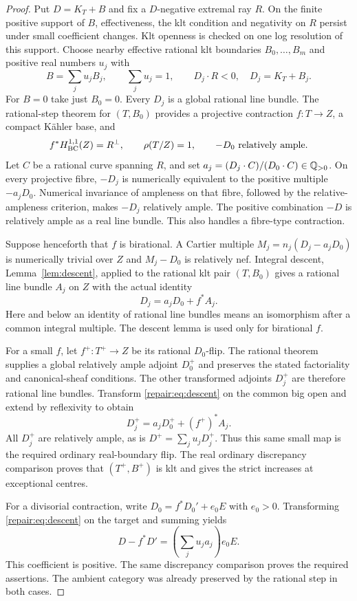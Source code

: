 \begin{proof}
Put $D=K_T+B$ and fix a $D$-negative extremal ray $R$. On the finite
positive support of $B$, effectiveness, the klt condition and negativity
on $R$ persist under small coefficient changes. Klt openness is checked
on one log resolution of this support. Choose nearby effective rational
klt boundaries $B_0,\ldots,B_m$ and positive real numbers $u_j$ with
\[
 B=\sum_j u_jB_j,\qquad \sum_j u_j=1,
 \qquad D_j\cdot R<0,\quad D_j=K_T+B_j.
\]
For $B=0$ take just $B_0=0$. Every $D_j$ is a global rational line
bundle. The rational-step theorem for $(T,B_0)$ provides a projective
contraction $f:T\to Z$, a compact K\"ahler base, and
\[
 f^*H^{1,1}_{\mathrm{BC}}(Z)=R^\perp,\qquad \rho(T/Z)=1,
 \qquad -D_0\text{ relatively ample}.
\]
Let $C$ be a rational curve spanning $R$, and set
$a_j=(D_j\cdot C)/(D_0\cdot C)\in\mathbb Q_{>0}$. On every projective
fibre, $-D_j$ is numerically equivalent to the positive multiple
$-a_jD_0$. Numerical invariance of ampleness on that fibre, followed
by the relative-ampleness criterion, makes $-D_j$ relatively ample.
The positive combination $-D$ is relatively ample as a real line
bundle. This also handles a fibre-type contraction.

Suppose henceforth that $f$ is birational. A Cartier multiple
$M_j=n_j(D_j-a_jD_0)$ is numerically trivial over $Z$ and
$M_j-D_0$ is relatively nef. Integral descent, Lemma~\ref{lem:descent},
applied to the rational klt pair $(T,B_0)$ gives a rational line bundle
$A_j$ on $Z$ with the actual identity
\begin{equation}\label{repair:eq:descent}
 D_j=a_jD_0+f^*A_j.
\end{equation}
Here and below an identity of rational line bundles means an isomorphism
after a common integral multiple. The descent lemma is used only for
birational $f$.

For a small $f$, let $f^+:T^+\to Z$ be its rational $D_0$-flip.
The rational theorem supplies a global relatively ample adjoint
$D_0^+$ and preserves the stated factoriality and canonical-sheaf
conditions. The other transformed adjoints $D_j^+$ are therefore
rational line bundles. Transform \eqref{repair:eq:descent} on the common
big open and extend by reflexivity to obtain
\[
 D_j^+=a_jD_0^++(f^+)^*A_j.
\]
All $D_j^+$ are relatively ample, as is
$D^+=\sum_j u_jD_j^+$. Thus this same small map is the required
ordinary real-boundary flip. The real ordinary discrepancy comparison
proves that $(T^+,B^+)$ is klt and gives the strict increases at
exceptional centres.

For a divisorial contraction, write
$D_0=f^*D_0'+e_0E$ with $e_0>0$. Transforming
\eqref{repair:eq:descent} on the target and summing yields
\[
 D-f^*D'=\left(\sum_j u_ja_j\right)e_0E.
\]
This coefficient is positive. The same discrepancy comparison proves
the required assertions. The ambient category was already preserved
by the rational step in both cases.
\end{proof}

